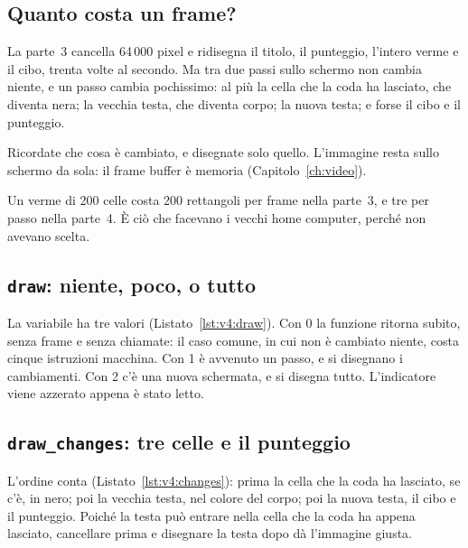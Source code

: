 \subsection{Quanto costa un frame?}

La parte~3 cancella 64\,000 pixel e ridisegna il titolo, il punteggio,
l'intero verme e il cibo, trenta volte al secondo. Ma tra due passi sullo
schermo non cambia niente, e un passo cambia pochissimo: al più la cella che
la coda ha lasciato, che diventa nera; la vecchia testa, che diventa corpo; la
nuova testa; e forse il cibo e il punteggio.

\begin{prgconcept}
Ricordate che cosa è cambiato, e disegnate solo quello. L'immagine resta sullo
schermo da sola: il frame buffer è memoria (Capitolo~\ref{ch:video}).
\end{prgconcept}

Un verme di 200 celle costa 200 rettangoli per frame nella parte~3, e tre per
passo nella parte~4. È ciò che facevano i vecchi home computer, perché non
avevano scelta.

\subsection{\texttt{draw}: niente, poco, o tutto}


La variabile  ha tre valori (Listato~\ref{lst:v4:draw}). Con 0 la
funzione ritorna subito, senza frame e senza chiamate: il caso comune, in cui
non è cambiato niente, costa cinque istruzioni macchina. Con 1 è avvenuto un
passo, e si disegnano i cambiamenti. Con 2 c'è una nuova schermata, e si
disegna tutto. L'indicatore viene azzerato appena è stato letto.

\subsection{\texttt{draw\_changes}: tre celle e il punteggio}


L'ordine conta (Listato~\ref{lst:v4:changes}): prima la cella che la coda ha
lasciato, se c'è, in nero; poi la vecchia testa, nel colore del corpo; poi la
nuova testa, il cibo e il punteggio. Poiché la testa può entrare nella cella
che la coda ha appena lasciato, cancellare prima e disegnare la testa dopo dà
l'immagine giusta.

